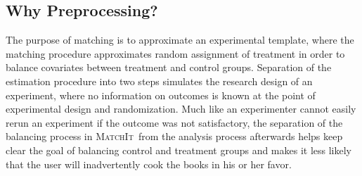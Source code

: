 \documentclass[oneside,letterpaper,titlepage]{article}
\newcommand{\MatchIt}{\textsc{MatchIt}}
\begin{document}
\subsection{Why Preprocessing?}

The purpose of matching is to approximate an experimental template,
where the matching procedure approximates random assignment of
treatment in order to balance covariates between treatment and control
groups.  Separation of the estimation procedure into two steps
simulates the research design of an experiment, where no information
on outcomes is known at the point of experimental design and
randomization.  Much like an experimenter cannot easily rerun an
experiment if the outcome was not satisfactory, the separation of the
balancing process in \MatchIt\ from the analysis process afterwards
helps keep clear the goal of balancing control and treatment groups
and makes it less likely that the user will inadvertently cook the
books in his or her favor.


\clearpage


\end{document}
